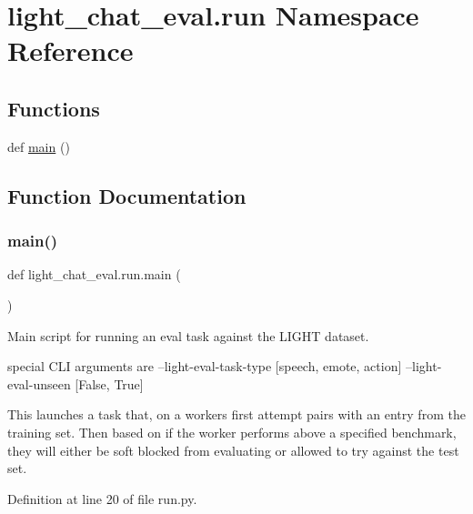 \hypertarget{namespacelight__chat__eval_1_1run}{}\section{light\+\_\+chat\+\_\+eval.\+run Namespace Reference}
\label{namespacelight__chat__eval_1_1run}
\subsection*{Functions}
\begin{DoxyCompactItemize}
\item 
def \hyperlink{namespacelight__chat__eval_1_1run_a6f95134244efdc98f98e673ae68c8037}{main} ()
\end{DoxyCompactItemize}


\subsection{Function Documentation}
\mbox{\label{namespacelight__chat__eval_1_1run_a6f95134244efdc98f98e673ae68c8037}} 
\subsubsection{\texorpdfstring{main()}{main()}}
{\footnotesize\ttfamily def light\+\_\+chat\+\_\+eval.\+run.\+main (\begin{DoxyParamCaption}{ }\end{DoxyParamCaption})}

\begin{DoxyVerb}Main script for running an eval task against the LIGHT dataset.

special CLI arguments are
  --light-eval-task-type [speech, emote, action]
  --light-eval-unseen [False, True]

This launches a task that, on a workers first attempt pairs with an entry
from the training set. Then based on if the worker performs above a
specified benchmark, they will either be soft blocked from evaluating or
allowed to try against the test set.
\end{DoxyVerb}
 

Definition at line 20 of file run.\+py.


